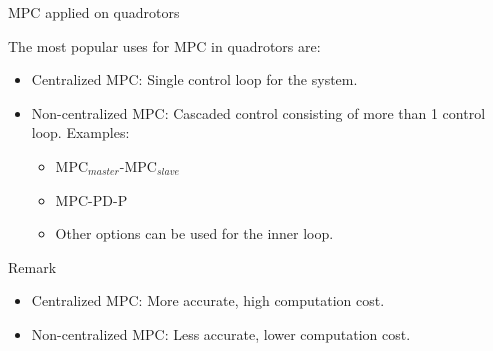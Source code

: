 \documentclass{thesisbeamer}
\newcommand\Fontvi{\fontsize{9}{10}\selectfont}
\begin{document}
\begin{frame}{MPC applied on quadrotors}
\Fontvi

The most popular uses for MPC in quadrotors are:

\begin{itemize} %
	\item Centralized MPC: Single control loop for the system.
	\item Non-centralized MPC: Cascaded control consisting of more than 1 control loop. Examples:
		\begin{itemize}
			\item MPC$_{master}$-MPC$_{slave}$
			\item MPC-PD-P
			\item Other options can be used for the inner loop.
		\end{itemize}
\end{itemize}

\begin{block}{Remark}
\begin{itemize}
	\item Centralized MPC: More accurate, high computation cost.
	\item Non-centralized MPC: Less accurate, lower computation cost. 
\end{itemize}
\end{block}

\end{frame}
\end{document}
